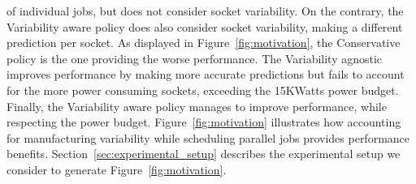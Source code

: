 of individual jobs, but does not consider socket variability.  On the contrary, the
Variability aware policy does also consider socket variability, making a different
prediction per socket.  As displayed in Figure~\ref{fig:motivation}, the Conservative policy is
the one providing the worse performance. The Variability agnostic improves performance by
making more accurate predictions but fails to account for the more power consuming
sockets, exceeding the 15KWatts power budget.  Finally,  the Variability aware policy
manages to improve performance, while respecting the power budget.  
Figure~\ref{fig:motivation} illustrates how accounting for manufacturing variability while scheduling parallel jobs provides performance benefits.
Section~\ref{sec:experimental_setup} describes the experimental setup we consider to generate Figure~\ref{fig:motivation}.


